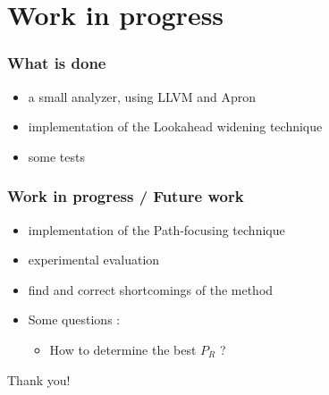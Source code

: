 \documentclass{beamer}
\begin{document}
\section[Work in progress]{Work in progress}

\begin{frame}
  \frametitle{What is done}
\begin{itemize}
\item a small analyzer, using LLVM and Apron
\item implementation of the Lookahead widening technique
\item some tests
\end{itemize}
\end{frame}

\begin{frame}
  \frametitle{Work in progress / Future work}
\begin{itemize}
\item implementation of the Path-focusing technique
\item experimental evaluation
\item find and correct shortcomings of the method
\item Some questions :
\begin{itemize}
\item  How to determine the best $P_R$ ?
\end{itemize}
\end{itemize}
\end{frame}

\begin{frame}
\begin{center}
Thank you!
\end{center}
\end{frame}
\end{document}
